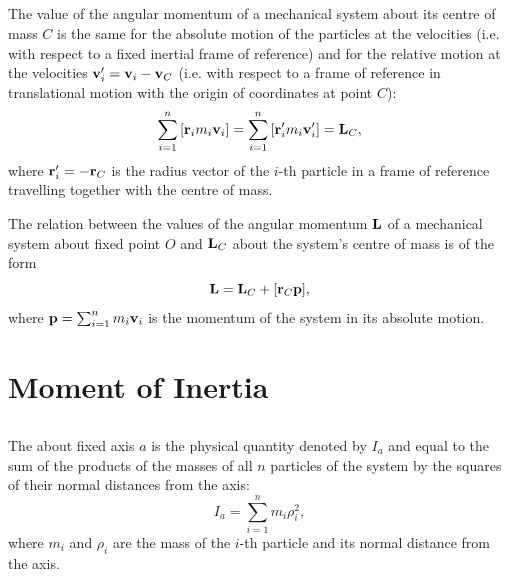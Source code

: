 \subsection{}\label{4.1.7} The value of the angular momentum of a mechanical system about its centre of mass $C$ is the same for the absolute motion of the particles at the velocities (i.e. with respect to a fixed inertial frame of reference) and for the relative motion at the velocities $\vb{v}_{i}' = \vb{v}_{i} - \vb{v}_{C}$ (i.e. with respect to a frame of reference in translational motion with the origin of coordinates at point $C$):
\begin{equation*}%
\sum_{i=1}^{n} \qty[\vb{r}_{i}m_{i} \vb{v}_{i}] = \sum_{i=1}^{n} \qty[\vb{r}_{i}'m_{i} \vb{v}_{i}'] = \vb{L}_{C},
\end{equation*}
where $\vb{r}_{i}' = - \vb{r}_{C}$ is the radius vector of the $i$-th particle in a frame of reference travelling together with the centre of mass.

The relation between the values of the angular momentum $\vb{L}$ of a mechanical system about fixed point $O$ and $\vb{L}_{C}$ about the system's centre of mass is of the form
\begin{equation*}%
\vb{L} = \vb{L}_{C} + \qty[\vb{r}_{C}\vb{p}],
\end{equation*}
where $\vb{p} = \sum_{i=1}^{n} m_{i}\vb{v}_{i}$ is the momentum of the system in its 
absolute motion.


\section{Moment of Inertia}
\label{sec-4.2}

\subsection{}\label{4.2.1} The  about fixed axis $a$ is the physical quantity denoted by $I_{a}$ and equal to the sum of the products of the masses of all $n$ particles of the system by the squares of their normal distances from the axis:
\begin{equation*}%
I_{a} =  \sum_{i=1}^{n} m_{i} \rho_{i}^{2},
\end{equation*}
where $m_{i}$ and $\rho_{i}$ are the mass of the $i$-th particle and its normal distance from the axis.

